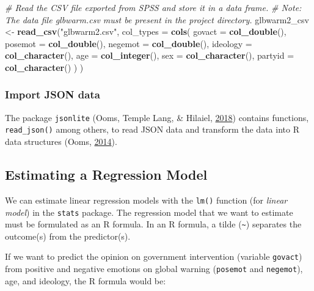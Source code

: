 \documentclass[doc,floatsintext]{apa6}
\newenvironment{Shaded}{\begin{snugshade}}{\end{snugshade}}
\newcommand{\KeywordTok}[1]{\textcolor[rgb]{0.13,0.29,0.53}{\textbf{#1}}}
\newcommand{\DataTypeTok}[1]{\textcolor[rgb]{0.13,0.29,0.53}{#1}}
\newcommand{\StringTok}[1]{\textcolor[rgb]{0.31,0.60,0.02}{#1}}
\newcommand{\CommentTok}[1]{\textcolor[rgb]{0.56,0.35,0.01}{\textit{#1}}}
\newcommand{\NormalTok}[1]{#1}
\begin{document}
\begin{Shaded}
\begin{Highlighting}[]
\CommentTok{# Read the CSV file exported from SPSS and store it in a data frame.}
\CommentTok{# Note: The data file glbwarm.csv must be present in the project directory.}
\NormalTok{glbwarm2_csv <-}\StringTok{ }\KeywordTok{read_csv}\NormalTok{(}\StringTok{"glbwarm2.csv"}\NormalTok{,}
                        \DataTypeTok{col_types =} \KeywordTok{cols}\NormalTok{(}
                          \DataTypeTok{govact =} \KeywordTok{col_double}\NormalTok{(),}
                          \DataTypeTok{posemot =} \KeywordTok{col_double}\NormalTok{(),}
                          \DataTypeTok{negemot =} \KeywordTok{col_double}\NormalTok{(),}
                          \DataTypeTok{ideology =} \KeywordTok{col_character}\NormalTok{(),}
                          \DataTypeTok{age =} \KeywordTok{col_integer}\NormalTok{(),}
                          \DataTypeTok{sex =} \KeywordTok{col_character}\NormalTok{(),}
                          \DataTypeTok{partyid =} \KeywordTok{col_character}\NormalTok{()}
\NormalTok{                          )}
\NormalTok{                        )}
\end{Highlighting}
\end{Shaded}

\subsubsection{Import JSON data}\label{import-json-data}

The package \texttt{jsonlite} (Ooms, Temple Lang, \& Hilaiel,
\protect\hyperlink{ref-R-jsonlite}{2018}) contains functions,
\texttt{read\_json()} among others, to read JSON data and transform the
data into R data structures (Ooms,
\protect\hyperlink{ref-oomsJsonlitePackagePractical2014}{2014}).

\subsection{Estimating a Regression Model}\label{regressionmodel}

We can estimate linear regression models with the \texttt{lm()} function
(for \emph{linear model}) in the \texttt{stats} package. The regression
model that we want to estimate must be formulated as an R formula. In an
R formula, a tilde (\texttt{\textasciitilde{}}) separates the outcome(s)
from the predictor(s).

If we want to predict the opinion on government intervention (variable
\texttt{govact}) from positive and negative emotions on global warning
(\texttt{posemot} and \texttt{negemot}), age, and ideology, the R
formula would be:
\end{document}
